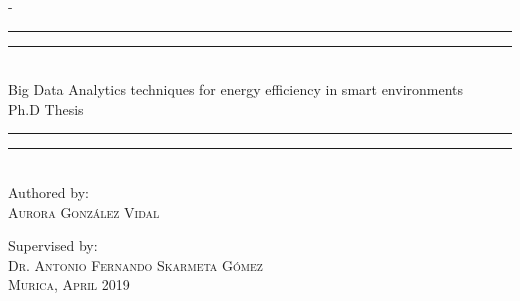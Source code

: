 \begin{titlingpage}
\begin{adjustwidth*}{\unitlength}{-\unitlength}
\begin{center}
\rule[0.5ex]{\linewidth}{2pt}\vspace*{-\baselineskip}\vspace*{3.2pt}
\rule[0.5ex]{\linewidth}{1pt}\\[\baselineskip]
{\HUGE Big Data Analytics techniques for energy efficiency in smart environments }\\[4mm]
{\Large Ph.D Thesis}\\
\rule[0.5ex]{\linewidth}{1pt}\vspace*{-\baselineskip}\vspace{3.2pt}
\rule[0.5ex]{\linewidth}{2pt}\\
\vspace{8mm}
{\large Authored by:}\\
\vspace{2.5mm}
{\large\textsc{Aurora Gonz\'alez Vidal}}\\
\vspace{6mm}

{\large Supervised by:}\\
\vspace{2.5mm}
{\large\textsc{Dr. Antonio Fernando Skarmeta G\'omez}}\\

\vspace{9mm}
{\large\textsc{Murica, April 2019}}
\vspace{12mm}
\end{center}
\end{adjustwidth*}
\end{titlingpage}